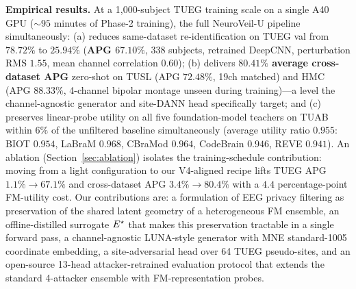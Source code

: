 \textbf{Empirical results.} At a 1{,}000-subject TUEG training scale on a single A40 GPU ($\sim\!95$ minutes of Phase-2 training), the full NeuroVeil-U pipeline simultaneously: (a) reduces same-dataset re-identification on TUEG val from $78.72\%$ to $25.94\%$ (\textbf{APG $67.10\%$}, 338 subjects, retrained DeepCNN, perturbation RMS $1.55$, mean channel correlation $0.60$); (b) delivers \textbf{$80.41\%$ average cross-dataset APG} zero-shot on TUSL (APG $72.48\%$, 19ch matched) and HMC (APG $88.33\%$, 4-channel bipolar montage unseen during training)---a level the channel-agnostic generator and site-DANN head specifically target; and (c) preserves linear-probe utility on all five foundation-model teachers on TUAB within $6\%$ of the unfiltered baseline simultaneously (average utility ratio $0.955$: BIOT $0.954$, LaBraM $0.968$, CBraMod $0.964$, CodeBrain $0.946$, REVE $0.941$). An ablation (Section~\ref{sec:ablation}) isolates the training-schedule contribution: moving from a light configuration to our V4-aligned recipe lifts TUEG APG $1.1\%\!\to\!67.1\%$ and cross-dataset APG $3.4\%\!\to\!80.4\%$ with a $4.4$ percentage-point FM-utility cost. Our contributions are: a formulation of EEG privacy filtering as preservation of the shared latent geometry of a heterogeneous FM ensemble, an offline-distilled surrogate $E^{\star}$ that makes this preservation tractable in a single forward pass, a channel-agnostic LUNA-style generator with MNE standard-1005 coordinate embedding, a site-adversarial head over 64 TUEG pseudo-sites, and an open-source 13-head attacker-retrained evaluation protocol that extends the standard 4-attacker ensemble with FM-representation probes.
